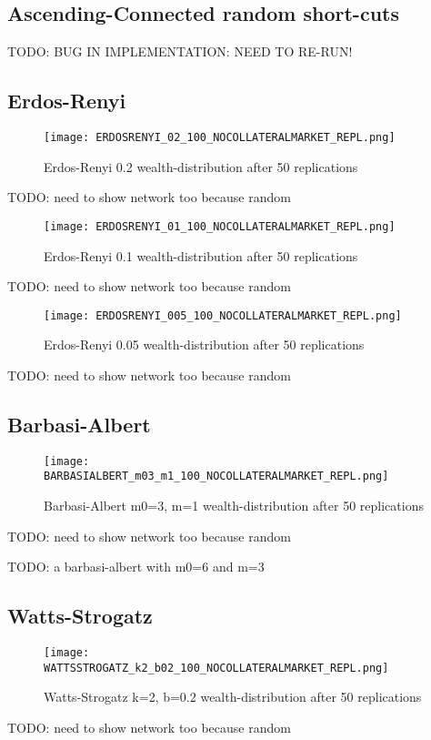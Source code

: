 \documentclass[Bachelorarbeit.tex]{subfiles}
\begin{document}
\subsection{Ascending-Connected random short-cuts}
TODO: BUG IN IMPLEMENTATION: NEED TO RE-RUN!


\subsection{Erdos-Renyi}
\begin{figure}[!htbp]
	\centering
  \texttt{[image: ERDOSRENYI\_02\_100\_NOCOLLATERALMARKET\_REPL.png]}
	\caption{Erdos-Renyi 0.2 wealth-distribution after 50 replications}
	\label{fig1}
\end{figure}

TODO: need to show network too because random

\begin{figure}[!htbp]
	\centering
  \texttt{[image: ERDOSRENYI\_01\_100\_NOCOLLATERALMARKET\_REPL.png]}
	\caption{Erdos-Renyi 0.1 wealth-distribution after 50 replications}
	\label{fig1}
\end{figure}

TODO: need to show network too because random

\begin{figure}[!htbp]
	\centering
  \texttt{[image: ERDOSRENYI\_005\_100\_NOCOLLATERALMARKET\_REPL.png]}
	\caption{Erdos-Renyi 0.05 wealth-distribution after 50 replications}
	\label{fig1}
\end{figure}

TODO: need to show network too because random

\subsection{Barbasi-Albert}
\begin{figure}[!htbp]
	\centering
  \texttt{[image: BARBASIALBERT\_m03\_m1\_100\_NOCOLLATERALMARKET\_REPL.png]}
	\caption{Barbasi-Albert m0=3, m=1 wealth-distribution after 50 replications}
	\label{fig1}
\end{figure}

TODO: need to show network too because random

TODO: a barbasi-albert with m0=6 and m=3

\subsection{Watts-Strogatz}
\begin{figure}[!htbp]
	\centering
  \texttt{[image: WATTSSTROGATZ\_k2\_b02\_100\_NOCOLLATERALMARKET\_REPL.png]}
	\caption{Watts-Strogatz k=2, b=0.2 wealth-distribution after 50 replications}
	\label{fig1}
\end{figure}

TODO: need to show network too because random
\end{document}

